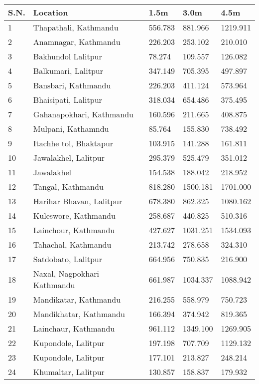 \begin{tabularx}{\textwidth}{ | l | p{} | X | X | X | }
\hline
 \textbf{S.N.} & \textbf{Location} & \textbf{1.5m} & \textbf{3.0m} & \textbf{4.5m}\\
\hline
 1 & Thapathali, Kathmandu & 556.783 & 881.966 & 1219.911 \\
 2 & Anamnagar, Kathmandu & 226.203 & 253.102 & 210.010 \\
 3 & Bakhundol Lalitpur & 78.274 & 109.557 & 126.082 \\
 4 & Balkumari, Lalitpur & 347.149 & 705.395 & 497.897 \\
 5 & Bansbari, Kathmandu & 226.203 & 411.124 & 573.964 \\
 6 & Bhaisipati, Lalitpur & 318.034 & 654.486 & 375.495 \\
 7 & Gahanapokhari, Kathmandu & 160.596 & 211.665 & 408.875 \\
 8 & Mulpani, Kathamndu  & 85.764 & 155.830 & 738.492 \\
 9 & Itachhe tol, Bhaktapur & 103.915 & 141.288 & 161.811 \\
 10 & Jawalakhel, Lalitpur  & 295.379 & 525.479 & 351.012 \\
 11 & Jawalakhel & 154.538 & 188.042 & 218.952 \\
 12 & Tangal, Kathmandu & 818.280 & 1500.181 & 1701.000 \\
 13 & Harihar Bhavan, Lalitpur & 678.380 & 862.325 & 1080.162 \\
 14 & Kuleswore, Kathmandu & 258.687 & 440.825 & 510.316 \\
 15 & Lainchour, Kathmandu & 427.627 & 1031.251 & 1534.093 \\
 16 & Tahachal, Kathmandu & 213.742 & 278.658 & 324.310 \\
 17 & Satdobato, Lalitpur & 664.956 & 750.835 & 216.900 \\
 18 & Naxal, Nagpokhari Kathmandu  & 661.987 & 1034.337 & 1088.942 \\
 19 & Mandikatar, Kathmandu  & 216.255 & 558.979 & 750.723 \\
 20 & Mandikhatar, Kathmandu  & 166.394 & 374.942 & 819.365 \\
 21 & Lainchaur, Kathmandu  & 961.112 & 1349.100 & 1269.905 \\
 22 & Kupondole, Lalitpur & 197.198 & 707.709 & 1129.132 \\
 23 & Kupondole, Lalitpur & 177.101 & 213.827 & 248.214 \\
 24 & Khumaltar, Lalitpur & 130.857 & 158.837 & 179.932 \\

\end{tabularx}
